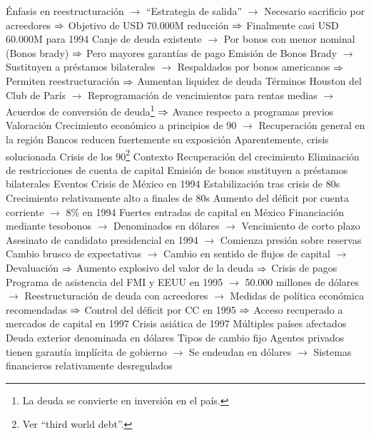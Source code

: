 \documentclass{nuevotema}
\begin{document}
\begin{esquemal}
				\4[] Énfasis en reestructuración
				\4[] $\to$ ``Estrategia de salida''
				\4[] $\to$ Necesario sacrificio por acreedores
				\4[] $\Rightarrow$ Objetivo de USD 70.000M reducción
				\4[] $\Rightarrow$ Finalmente casi USD 60.000M para 1994
				\4[] Canje de deuda existente
				\4[] $\to$ Por bonos con menor nominal (Bonos brady)
				\4[] $\Rightarrow$ Pero mayores garantías de pago
				\4[] Emisión de Bonos Brady
				\4[] $\to$ Sustituyen a préstamos bilaterales
				\4[] $\to$ Respaldados por bonos americanos
				\4[] $\Rightarrow$ Permiten reestructuración
				\4[] $\Rightarrow$ Aumentan liquidez de deuda
				\4[] Términos Houston del Club de París
				\4[] $\to$ Reprogramación de vencimientos para rentas medias
				\4[] $\to$ Acuerdos de conversión de deuda\footnote{La deuda se convierte en inversión en el país. }
				\4[] $\Rightarrow$ Avance respecto a programas previos
				\4 Valoración
				\4[] Crecimiento económico a principios de 90
				\4[] $\to$ Recuperación general en la región
				\4[] Bancos reducen fuertemente su exposición
				\4[] Aparentemente, crisis solucionada
		\2 Crisis de los 90\footnote{Ver ``third world debt''.}
			\3 Contexto
				\4 Recuperación del crecimiento
				\4 Eliminación de restricciones de cuenta de capital
				\4 Emisión de bonos sustituyen a préstamos bilaterales
			\3 Eventos
				\4 Crisis de México en 1994
				\4[] Estabilización tras crisis de 80s
				\4[] Crecimiento relativamente alto a finales de 80s
				\4[] Aumento del déficit por cuenta corriente
				\4[] $\to$ 8\% en 1994
				\4[] Fuertes entradas de capital en México
				\4[] Financiación mediante tesobonos
				\4[] $\to$ Denominados en dólares
				\4[] $\to$ Vencimiento de corto plazo
				\4[] Asesinato de candidato presidencial en 1994
				\4[] $\to$ Comienza presión sobre reservas
				\4[] Cambio brusco de expectativas
				\4[] $\to$ Cambio en sentido de flujos de capital
				\4[] $\to$ Devaluación
				\4[] $\Rightarrow$ Aumento explosivo del valor de la deuda
				\4[] $\Rightarrow$ Crisis de pagos
				\4[] Programa de asistencia del FMI y EEUU en 1995
				\4[] $\to$ 50.000 millones de dólares
				\4[] $\to$ Reestructuración de deuda con acreedores
				\4[] $\to$ Medidas de política económica recomendadas
				\4[] $\Rightarrow$ Control del déficit por CC en 1995
				\4[] $\Rightarrow$ Acceso recuperado a mercados de capital en 1997
				\4 Crisis asiática de 1997
				\4[] Múltiples países afectados
				\4[] Deuda exterior denominada en dólares
				\4[] Tipos de cambio fijo
				\4[] Agentes privados tienen garantía implícita de gobierno
				\4[] $\to$ Se endeudan en dólares
				\4[] $\to$ Sistemas financieros relativamente desregulados

\end{esquemal}
\end{document}
